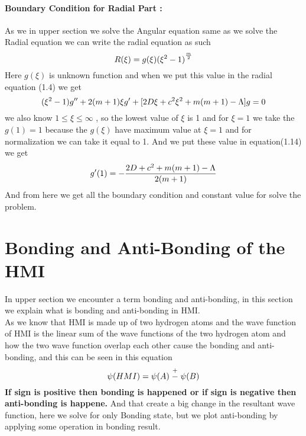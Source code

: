\documentclass[12pt]{report}
\begin{document}
		\paragraph{Boundary Condition for Radial Part :}
			\boldmath \normalsize As we in upper section we solve the Angular equation same as we solve the Radial equation we can write the radial equation as such \\
			\begin{equation}
				\normalsize \boldmath
				R(\xi) = g(\xi){({\xi}^{2} -1 )}^{\frac{m}{2}}
			\end{equation}
			\boldmath \normalsize Here $g(\xi)$ is unknown function and when we put this value in the radial equation (1.4) we get 
		 	\begin{equation}
		 		\normalsize \boldmath
		 		({\xi}^{2}-1)g'' + 2(m+1)\xi g' + [2D\xi + c^{2}{\xi}^{2} + m(m+1) - \Lambda]g = 0 
		 	\end{equation}
		 	\boldmath \normalsize we also know $ 1 ≤ \xi ≤ ∞$ , so the lowest value of $\xi$ is 1 and for $\xi=1$ we take the $g(1) =1 $ because the $g(\xi)$ have maximum value at $\xi=1$ and for normalization we can take it equal to 1. And we put these value in equation(1.14) we get \\
		 	\begin{equation}
		 		\normalsize \boldmath
		 		g'(1) = - \frac{2D + c^2 + m(m+1) - \Lambda}{2(m+1)}
		 	\end{equation}
		 \normalsize And from here we get all the boundary condition and constant value for solve the problem.
	\section{Bonding and Anti-Bonding of the HMI}
		\normalsize \boldmath In upper section we encounter a term bonding and anti-bonding, in this section we explain what is bonding and anti-bonding in HMI.\\
		\normalsize \boldmath As we know that HMI is made up of two hydrogen atoms and the wave function of HMI is the linear sum of the wave functions of the two hydrogen atom and how the two wave function overlap each other cause the bonding and anti-bonding, and this can be seen in this equation 
		\begin{equation}
			\normalsize \boldmath
			\psi (HMI) = \psi (A) \stackrel{+}{-} \psi(B)
		\end{equation} 
		\textbf{\normalsize If sign is positive then bonding is happened or if sign is negative then anti-bonding is happene.}
		\normalsize And that create a big change in the resultant wave function, here we solve for only Bonding state, but we plot anti-bonding by applying some operation in bonding result.
\end{document}

